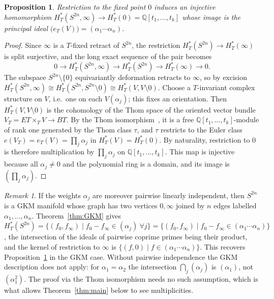 \documentclass[11pt,a4paper]{article}
\numberwithin{equation}{section}
\theoremstyle{plain}
\newtheorem{proposition}[theorem]{Proposition}
\theoremstyle{definition}
\theoremstyle{remark}
\newtheorem{remark}[theorem]{Remark}
\newcommand{\Q}{\mathbb{Q}}
\newcommand{\HT}{H^{*}_{T}}
\begin{document}
\begin{proposition}\label{prop:sphere}
Restriction to the fixed point $0$ induces an injective homomorphism $\HT(S^{2n},\infty)\to\HT(0)=\Q[t_1,\dots,t_k]$ whose image is the principal ideal $\bigl(e_T(V)\bigr)=(\alpha_1\cdots\alpha_n)$.
\end{proposition}
\begin{proof}
Since $\infty$ is a $T$-fixed retract of $S^{2n}$, the restriction $\HT(S^{2n})\to\HT(\infty)$ is split surjective, and the long exact sequence of the pair becomes
\[
0\to\HT(S^{2n},\infty)\to\HT(S^{2n})\to\HT(\infty)\to0.
\]
The subspace $S^{2n}\setminus\{0\}$ equivariantly deformation retracts to $\infty$, so by excision $\HT(S^{2n},\infty)\cong\HT(S^{2n},S^{2n}\setminus0)\cong\HT(V,V\setminus0)$. Choose a $T$-invariant complex structure on $V$, i.e.\ one on each $V(\alpha_j)$; this fixes an orientation. Then $\HT(V,V\setminus0)$ is the cohomology of the Thom space of the oriented vector bundle $V_T=ET\times_TV\to BT$. By the Thom isomorphism~\cite{MSt74}, it is a free $\Q[t_1,\dots,t_k]$-module of rank one generated by the Thom class $\tau$, and $\tau$ restricts to the Euler class $e(V_T)=e_T(V)=\prod_j\alpha_j$ in $\HT(V)=\HT(0)$. By naturality, restriction to $0$ is therefore multiplication by $\prod_j\alpha_j$ on $\Q[t_1,\dots,t_k]$. This map is injective because all $\alpha_j\neq0$ and the polynomial ring is a domain, and its image is $(\prod_j\alpha_j)$.
\end{proof}

\begin{remark}
If the weights $\alpha_j$ are moreover pairwise linearly independent, then $S^{2n}$ is a GKM manifold whose graph has two vertices $0,\infty$ joined by $n$ edges labelled $\alpha_1,\dots,\alpha_n$. Theorem~\ref{thm:GKM} gives $\HT(S^{2n})=\{(f_0,f_\infty)\mid f_0-f_\infty\in(\alpha_j)\ \forall j\}=\{(f_0,f_\infty)\mid f_0-f_\infty\in(\alpha_1\cdots\alpha_n)\}$, the intersection of the ideals of pairwise coprime primes being their product, and the kernel of restriction to $\infty$ is $\{(f,0)\mid f\in(\alpha_1\cdots\alpha_n)\}$. This recovers Proposition~\ref{prop:sphere} in the GKM case. Without pairwise independence the GKM description does not apply: for $\alpha_1=\alpha_2$ the intersection $\bigcap_j(\alpha_j)$ is $(\alpha_1)$, not $(\alpha_1^2)$. The proof via the Thom isomorphism needs no such assumption, which is what allows Theorem~\ref{thm:main} below to see multiplicities.
\end{remark}
\end{document}
